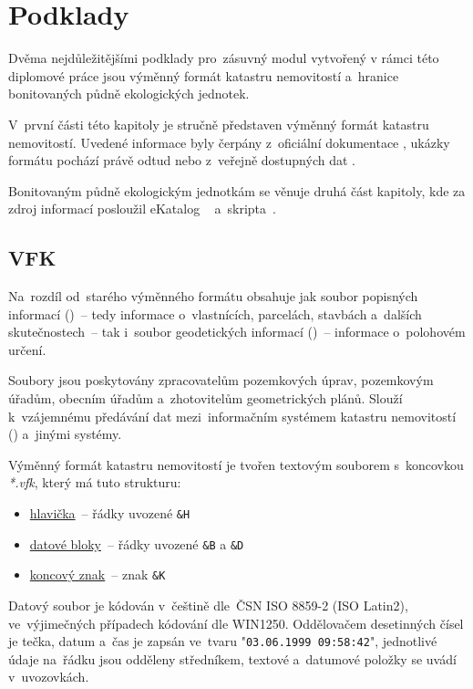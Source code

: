 \chapter{Podklady}
\label{podklady}

Dvěma nejdůležitějšími podklady pro~zásuvný modul vytvořený v rámci této diplomové práce jsou výměnný formát katastru nemovitostí a~hranice bonitovaných půdně ekologických jednotek.

V~první části této kapitoly je stručně představen výměnný formát katastru nemo\-vitostí. Uvedené informace byly čerpány z~oficiální dokumentace \citep{struktura_vfk}, ukázky formátu pochází právě odtud nebo z~veřejně dostupných dat \citep{zdroj_vfk}.

Bonitovaným půdně ekologickým jednotkám se věnuje druhá část kapitoly, kde za zdroj informací posloužil eKatalog ~\citep{vumop_bpej} a~skripta~\citep{pu_skripta}.

\section{VFK}
\label{vfk}

Na~rozdíl od~starého výměnného formátu obsahuje  jak soubor popisných informací ()~– tedy informace o~vlastnících, parcelách, stavbách a~dalších skutečnostech~– tak i~soubor geodetických informací ()~– informace o~polohovém určení.

Soubory  jsou poskytovány zpracovatelům pozemkových úprav, pozemko\-vým úřadům, obecním úřadům a~zhotovitelům geometrických plánů. Slouží k~vzájemnému předávání dat mezi~informačním systémem katastru nemovitostí () a~jiný\-mi systémy.

Výměnný formát katastru nemovitostí je tvořen textovým souborem s~koncovkou \textit{*.vfk}, který má tuto strukturu:
	\begin{itemize}[leftmargin=1.5cm, noitemsep]
		\item \underline{hlavička}~– řádky uvozené \texttt{\&H}
		\item \underline{datové bloky}~– řádky uvozené \texttt{\&B} a \texttt{\&D}
		\item \underline{koncový znak}~– znak \texttt{\&K}
	\end{itemize}

Datový soubor je kódován v~češtině dle~ČSN ISO 8859-2 (ISO Latin2), ve~výjimeč\-ných případech kódování dle
WIN1250. Oddělovačem desetinných čísel je tečka, datum a~čas je zapsán ve~tvaru "\texttt{03.06.1999 09:58:42}", jednotlivé údaje na~řádku jsou odděleny středníkem, textové a~datumové položky se uvádí v~uvozovkách.

